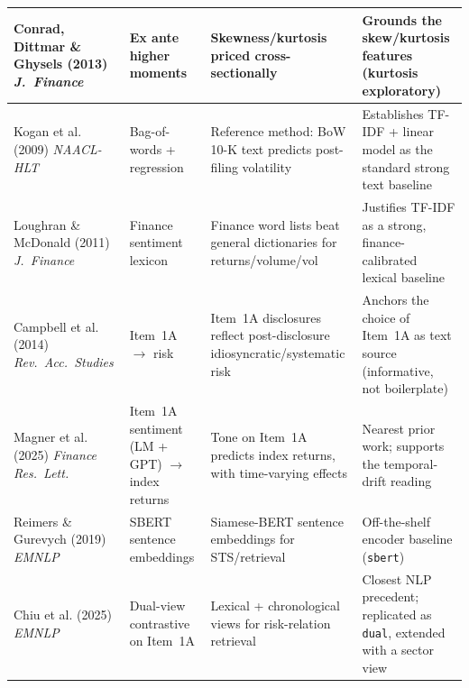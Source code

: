 \documentclass[logo,msc,ai]{infthesis}        %
\begin{document}
{\begin{longtable}{@{}L{2.4cm}L{2.6cm}L{3.7cm}L{3.7cm}@{}}
Conrad, Dittmar \& Ghysels (2013) \cite{conrad2013ex}\newline \textit{J.\ Finance} &
Ex ante higher moments &
Skewness/kurtosis priced cross-sectionally &
Grounds the skew/kurtosis features (kurtosis exploratory) \\
\hline

Kogan et al. (2009) \cite{kogan2009predicting}\newline \textit{NAACL-HLT} &
Bag-of-words + regression &
Reference method: BoW 10-K text predicts post-filing volatility &
Establishes TF-IDF + linear model as the standard strong text baseline \\
\hline

Loughran \& McDonald (2011) \cite{loughran2011liability}\newline \textit{J.\ Finance} &
Finance sentiment lexicon &
Finance word lists beat general dictionaries for returns/volume/vol &
Justifies TF-IDF as a strong, finance-calibrated lexical baseline \\
\hline

Campbell et al. (2014) \cite{campbell2014information}\newline \textit{Rev.\ Acc.\ Studies} &
Item~1A $\rightarrow$ risk &
Item~1A disclosures reflect post-disclosure idiosyncratic/systematic risk &
Anchors the choice of Item~1A as text source (informative, not boilerplate) \\
\hline

Magner et al. (2025) \cite{magner2025decoding}\newline \textit{Finance Res.\ Lett.} &
Item~1A sentiment (LM + GPT) $\rightarrow$ index returns &
Tone on Item~1A predicts index returns, with time-varying effects &
Nearest prior work; supports the temporal-drift reading \\
\hline

Reimers \& Gurevych (2019) \cite{reimers2019sentence}\newline \textit{EMNLP} &
SBERT sentence embeddings &
Siamese-BERT sentence embeddings for STS/retrieval &
Off-the-shelf encoder baseline (\texttt{sbert}) \\
\hline

Chiu et al. (2025) \cite{chiu2025financial}\newline \textit{EMNLP} &
Dual-view contrastive on Item~1A &
Lexical + chronological views for risk-relation retrieval &
Closest NLP precedent; replicated as \texttt{dual}, extended with a sector view \\
\hline


\end{longtable}}
\end{document}
